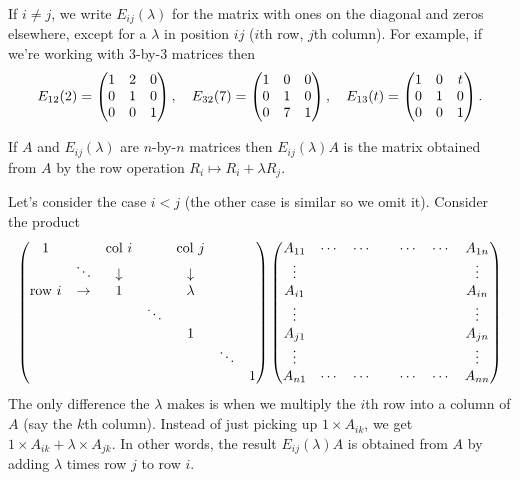 \documentclass{article}
\begin{document}
\begin{Definition}\label{dfn:elematrix}
If \(i\neq j\), we write \(E_{ij}(\lambda)\) for the matrix with
ones on the diagonal and zeros elsewhere, except for a \(\lambda\)
in position \(ij\) (\(i\)th row, \(j\)th column). For example, if
we're working with \(3\)-by-\(3\) matrices then \[E_{12}(2)=\begin{pmatrix} 1 &
2 & 0 \\ 0 & 1 & 0 \\ 0 & 0 & 1\end{pmatrix},\quad E_{32}(7)=\begin{pmatrix} 1 & 0 & 0
\\ 0 & 1 & 0 \\ 0 & 7 & 1\end{pmatrix},\quad E_{13}(t)=\begin{pmatrix} 1 & 0 & t\\ 0 & 1 &
0 \\ 0 & 0 & 1\end{pmatrix}.\]


\end{Definition}
\begin{Lemma}
If \(A\) and \(E_{ij}(\lambda)\) are \(n\)-by-\(n\) matrices then
\(E_{ij}(\lambda)A\) is the matrix obtained from \(A\) by the row
operation \(R_i\mapsto R_i+\lambda R_j\).
\end{Lemma}
\begin{Proof}
Let's consider the case \(i<j\) (the other case is similar so we
omit it). Consider the product
\[\begin{pmatrix}
1 & & \mbox{col }i & & \mbox{col }j & & \\
& \ddots & \downarrow & & \downarrow & & \\
\mbox{row }i&\rightarrow & 1 & & \lambda & &\\
& & & \ddots & & & \\
& & & & 1 & & \\
& & & & & \ddots &\\
& & & & & & 1
\end{pmatrix}
\begin{pmatrix}
A_{11} & \cdots & \cdots & & \cdots & \cdots & A_{1n} \\
\vdots & & & & & & \vdots \\
A_{i1} & & & & & & A_{in} \\
\vdots & & & & & & \vdots \\
A_{j1} & & & & & & A_{jn} \\
\vdots & & & & & & \vdots \\
A_{n1} & \cdots & \cdots & & \cdots & \cdots & A_{nn}
\end{pmatrix}\]
The only difference the \(\lambda\) makes is when we multiply the
\(i\)th row into a column of \(A\) (say the \(k\)th column). Instead
of just picking up \(1\times A_{ik}\), we get \(1\times
A_{ik}+\lambda\times A_{jk}\). In other words, the result
\(E_{ij}(\lambda)A\) is obtained from \(A\) by adding \(\lambda\)
times row \(j\) to row \(i\).\qedhere


\end{Proof}
\end{document}
